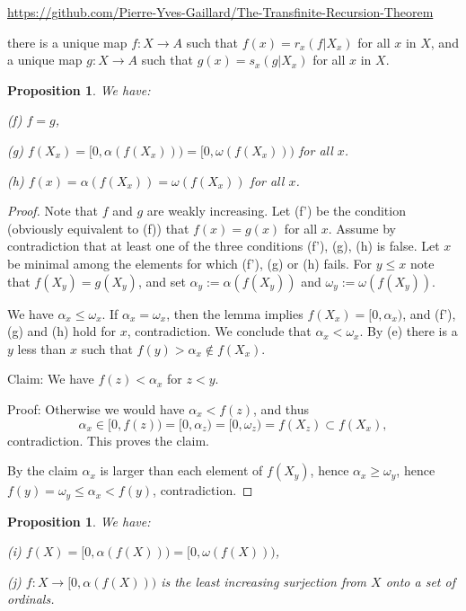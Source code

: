 \documentclass[12pt,letterpaper]{article}
\newtheorem{prop}[thm]{Proposition}
\newcommand{\noi}{\noindent}
\begin{document}
\url{https://github.com/Pierre-Yves-Gaillard/The-Transfinite-Recursion-Theorem}

\noi there is a unique map $f:X\to A$ such that $f(x)=r_x(f|X_x)$ for all $x$ in $X$, and a unique map $g:X\to A$ such that $g(x)=s_x(g|X_x)$ for all $x$ in $X$. 

\begin{prop}\label{P3} 
We have: 

\noi\emph{(f)} $f=g$, 

\noi\emph{(g)} $f(X_x)=[0,\alpha(f(X_x)))=[0,\omega(f(X_x)))$ for all $x$. 

\noi\emph{(h)} $f(x)=\alpha(f(X_x))=\omega(f(X_x))$ for all $x$. 
\end{prop} 

\begin{proof} 
Note that $f$ and $g$ are weakly increasing. Let (f') be the condition (obviously equivalent to (f)) that $f(x)=g(x)$ for all $x$. Assume by contradiction that at least one of the three conditions (f'), (g), (h) is false. Let $x$ be minimal among the elements for which (f'), (g) or (h) fails. For $y\le x$ note that $f(X_y)=g(X_y)$, and set $\alpha_y:=\alpha(f(X_y))$ and $\omega_y:=\omega(f(X_y))$. 

We have $\alpha_x\le\omega_x$. If $\alpha_x=\omega_x$, then the lemma implies $f(X_x)=[0,\alpha_x)$, and (f'), (g) and (h) hold for $x$, contradiction. We conclude that $\alpha_x<\omega_x$. By (e) there is a $y$ less than $x$ such that $f(y)>\alpha_x\notin f(X_x)$. %

\noi Claim: We have $f(z)<\alpha_x$ for $z<y$. 

\noi Proof: Otherwise we would have $\alpha_x<f(z)$, and thus  
$$
\alpha_x\in[0,f(z))=[0,\alpha_z)=[0,\omega_z)=f(X_z)\subset f(X_x),
$$ 
contradiction. This proves the claim. 

By the claim $\alpha_x$ is larger than each element of $f(X_y)$, hence $\alpha_x\ge\omega_y$, hence $f(y)=\omega_y\le\alpha_x<f(y)$, contradiction. 
\end{proof} 

\begin{prop}\label{P4} 
We have: 

\noi\emph{(i)} $f(X)=[0,\alpha(f(X)))=[0,\omega(f(X)))$, 

\noi\emph{(j)} $f:X\to[0,\alpha(f(X)))$ is the least increasing surjection from $X$ onto a set of ordinals. 
\end{prop} 
\end{document}
